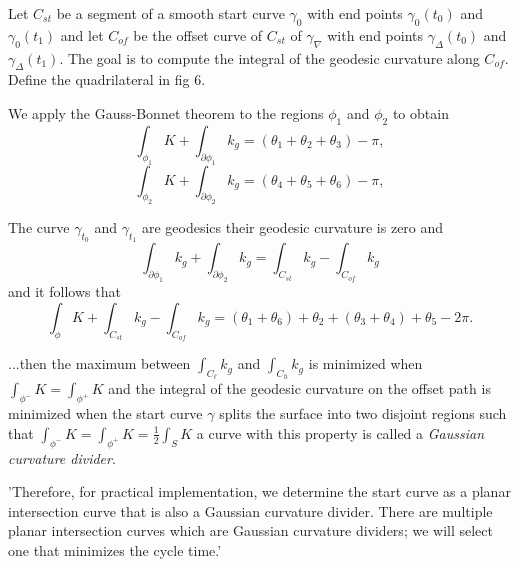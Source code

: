 Let $C_{st}$  be a segment of a smooth start curve $\gamma_0$
with end points $\gamma_0(t_0)$ and $\gamma_0(t_1)$ and let
$C_{of}$ be the offset curve of $C_{st}$ of $\gamma_\nabla$
with end points $\gamma_\Delta(t_0)$ and $\gamma_\Delta(t_1).$
The goal is to compute the integral of the geodesic curvature along $C_{of}.$
Define the quadrilateral in fig 6.

We apply the Gauss-Bonnet theorem to the regions $\phi_1$ and $\phi_2$ to
obtain
\begin{equation}\label{eqn:phi-1}
\int_{\phi_1}K+\int_{\partial\phi_1}k_g=(\theta_1+\theta_2+\theta_3)-\pi,
\end{equation}
\begin{equation}\label{eqn:phi-2}
\int_{\phi_2}K+\int_{\partial\phi_2}k_g=(\theta_4+\theta_5+\theta_6)-\pi,
\end{equation}

The curve $\gamma_{t_0}$ and $\gamma_{t_1}$ are geodesics
their geodesic curvature is zero and
\begin{equation}\label{eqn:phi-sum}
\int_{\partial\phi_1}k_g+\int_{\partial\phi_2}k_g=\int_{C_{st}}k_g -\int_{C_{of}}k_g
\end{equation}
and it follows that 
\begin{equation}\label{eqn:phi-sum}
\int_{\phi}K+\int_{C_{st}}k_g -\int_{C_{of}}k_g=(\theta_1+\theta_6)+\theta_2 +(\theta_3+\theta_4)+\theta_5-2\pi.
\end{equation}

...then the maximum between $\int_{C_\ell} k_g$ and $\int_{C_h} k_g$ is minimized when
$\int_{\phi^-}K=\int_{\phi^+}K$ and the integral of the geodesic curvature on the offset path
is minimized when the start curve $\gamma$ splits the surface into two disjoint regions
such that $\int_{\phi^-}K=\int_{\phi^+}K=\frac{1}{2}\int_S K$ a curve with this property
is called a \emph{Gaussian curvature divider}.

'Therefore, for practical implementation, we determine the start curve as a planar intersection curve that
is also a Gaussian curvature divider. There are multiple
planar intersection curves which are Gaussian curvature
dividers; we will select one that minimizes the cycle time.'